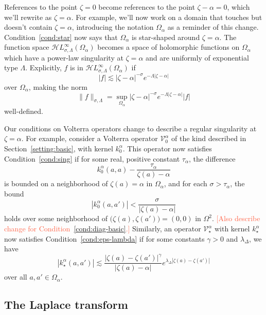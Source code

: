 \documentclass{article}
\theoremstyle{plain}
\newcommand{\singexp}[2]{\mathcal{H}L^\infty_{#1, #2}}
\newcommand{\hardpart}{\mathcal{V}_0}
\newcommand{\softpart}{\mathcal{V}_\star}
\newcommand{\hardker}{k_0}
\newcommand{\softker}{k_\star}
\newcommand{\domain}{\Omega}
\begin{document}
References to the point $\zeta=0$ become references to the point $\zeta-\alpha=0$, which we'll rewrite as $\zeta=\alpha$. For example, we'll now work on a domain that touches but doesn't contain $\zeta = \alpha$, introducing the notation $\domain_\alpha$ as a reminder of this change. Condition~\eqref{cond:star} now says that $\domain_\alpha$ is star-shaped around $\zeta = \alpha$. The function space $\singexp{\sigma}{\Lambda}(\domain_\alpha)$ becomes a space of holomorphic functions on $\domain_\alpha$ which have a power-law singularity at $\zeta=\alpha$ and are uniformly of exponential type $\Lambda$. Explicitly, $f$ is in $\singexp{\sigma}{\Lambda}(\domain_\alpha)$ if 
\[ |f| \lesssim |\zeta-\alpha|^{-\sigma} e^{-\Lambda |\zeta-\alpha|} \]
over $\domain_\alpha$, making the norm
\[ \|f\|_{\sigma, \Lambda} = \sup_{\domain_\alpha} |\zeta-\alpha|^{-\sigma} e^{-\Lambda |\zeta-\alpha|} |f| \]
well-defined.

Our conditions on Volterra operators change to describe a regular singularity at $\zeta = \alpha$. For example, consider a Volterra operator $\hardpart^\alpha$ of the kind described in Section~\ref{setting:basic}, with kernel $\hardker^\alpha$. This operator now satisfies Condition~\eqref{cond:sing} if for some real, positive constant $\tau_\alpha$, the difference
\[ \hardker^\alpha(a, a) - \frac{\tau_\alpha}{\zeta(a) - \alpha} \]
is bounded on a neighborhood of $\zeta(a) = \alpha$ in $\domain_\alpha$, and for each $\sigma > \tau_\alpha$, the bound
\[ |\hardker^\alpha(a, a')| < \frac{\sigma}{|\zeta(a) - \alpha|} \]
holds over some neighborhood of $\big(\zeta(a), \zeta(a')\big) = (0, 0)$ in $\domain^2$. \textcolor{Tomato}{[Also describe change for Condition~\eqref{cond:diag-basic}.]} Similarly, an operator $\softpart^\alpha$ with kernel $\softker^\alpha$ now satisfies Condition~\eqref{cond:eps-lambda} if for some constants $\gamma > 0$ and $\lambda_\Delta$, we have
\[ |\softker^\alpha(a,a')| \lesssim \frac{|\zeta(a)-\zeta(a')|^\gamma}{|\zeta(a)-\alpha|} e^{\lambda_\Delta |\zeta(a)-\zeta(a')|}\]
over all $a, a' \in \domain_\alpha$.
\subsection{The Laplace transform}
\end{document}
